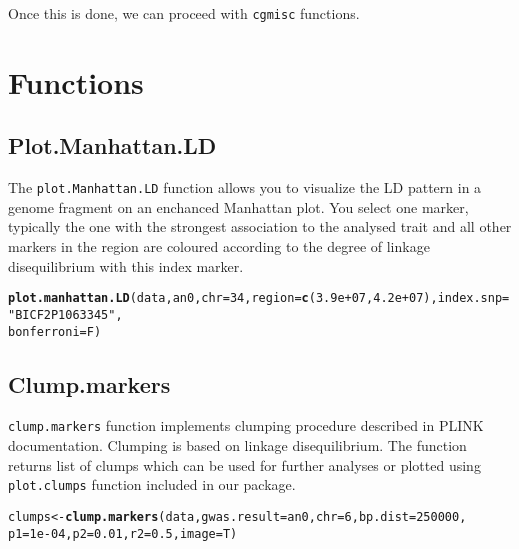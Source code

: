 \documentclass[12pt,a4paper,oneside]{article}\usepackage[]{graphicx}\usepackage[]{color}
\makeatletter
\newcommand{\hlnum}[1]{\textcolor[rgb]{0.686,0.059,0.569}{#1}}%
\newcommand{\hlstr}[1]{\textcolor[rgb]{0.192,0.494,0.8}{#1}}%
\newcommand{\hlstd}[1]{\textcolor[rgb]{0.345,0.345,0.345}{#1}}%
\newcommand{\hlkwb}[1]{\textcolor[rgb]{0.69,0.353,0.396}{#1}}%
\newcommand{\hlkwc}[1]{\textcolor[rgb]{0.333,0.667,0.333}{#1}}%
\newcommand{\hlkwd}[1]{\textcolor[rgb]{0.737,0.353,0.396}{\textbf{#1}}}%
\newenvironment{kframe}{%
 \def\at@end@of@kframe{}%
 \ifinner\ifhmode%
  \def\at@end@of@kframe{\end{minipage}}%
  \begin{minipage}{\columnwidth}%
 \fi\fi%
 \def\FrameCommand##1{\hskip\@totalleftmargin \hskip-\fboxsep
 \colorbox{shadecolor}{##1}\hskip-\fboxsep
     \hskip-\linewidth \hskip-\@totalleftmargin \hskip\columnwidth}%
 \MakeFramed {\advance\hsize-\width
   \@totalleftmargin\z@ \linewidth\hsize
   \@setminipage}}%
 {\par\unskip\endMakeFramed%
 \at@end@of@kframe}
\newenvironment{knitrout}{}{} %
\makeatother
\begin{document}
\noindent Once this is done, we can proceed with \texttt{cgmisc} functions.

\newpage

\section*{Functions}
\subsection{Plot.Manhattan.LD}
\noindent The \texttt{plot.Manhattan.LD} function allows you to visualize the LD pattern in a genome fragment on an enchanced Manhattan plot. You select one marker, typically the one with the strongest association to the analysed trait and all other markers in the region are coloured according to the degree of linkage disequilibrium with this index marker. 

\begin{knitrout}\footnotesize
{}\color{fgcolor}\begin{kframe}
\begin{alltt}
\hlkwd{plot.manhattan.LD}\hlstd{(data, an0,} \hlkwc{chr} \hlstd{=} \hlnum{34}\hlstd{,} \hlkwc{region} \hlstd{=} \hlkwd{c}\hlstd{(}\hlnum{3.9e+07}\hlstd{,} \hlnum{4.2e+07}\hlstd{),} \hlkwc{index.snp} \hlstd{=} \hlstr{"BICF2P1063345"}\hlstd{,}
    \hlkwc{bonferroni} \hlstd{= F)}
\end{alltt}


{\ttfamily\noindent\bfseries{}}\end{kframe}
\end{knitrout}

\subsection{Clump.markers}
\noindent \texttt{clump.markers} function implements clumping procedure described in PLINK documentation. Clumping is based on linkage disequilibrium. The function returns list of clumps which can be used for further analyses or plotted using \texttt{plot.clumps} function included in our package.

\begin{knitrout}\footnotesize
{}\color{fgcolor}\begin{kframe}
\begin{alltt}
\hlstd{clumps} \hlkwb{<-} \hlkwd{clump.markers}\hlstd{(data,} \hlkwc{gwas.result} \hlstd{= an0,} \hlkwc{chr} \hlstd{=} \hlnum{6}\hlstd{,} \hlkwc{bp.dist} \hlstd{=} \hlnum{250000}\hlstd{,}
    \hlkwc{p1} \hlstd{=} \hlnum{1e-04}\hlstd{,} \hlkwc{p2} \hlstd{=} \hlnum{0.01}\hlstd{,} \hlkwc{r2} \hlstd{=} \hlnum{0.5}\hlstd{,} \hlkwc{image} \hlstd{= T)}
\end{alltt}


{\ttfamily\noindent\bfseries\color{errorcolor}{\#\# Error: object 'an0' not found}}\end{kframe}
\end{knitrout}
\end{document}
